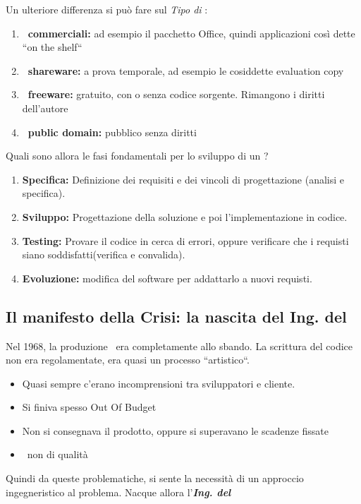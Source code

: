 Un ulteriore differenza si pu\`o fare sul \emph{Tipo di \sw }:
\begin{enumerate}
    \item \textbf{ \sw\ commerciali:} ad esempio il pacchetto Office, quindi applicazioni
    cos\`i dette ``on the shelf``
    \item \textbf{ \sw\ shareware:} a prova temporale, ad esempio le cosiddette evaluation copy
    \item \textbf{ \sw\ freeware:} gratuito, con o senza codice sorgente. Rimangono i diritti dell'autore
    \item \textbf{ \sw\ public domain:} pubblico senza diritti
\end{enumerate}
Quali sono allora le fasi fondamentali per lo sviluppo di un \sw ?
\begin{enumerate}
    \item \textbf{Specifica:} Definizione dei requisiti e dei vincoli di progettazione (analisi e specifica).
    \item \textbf{Sviluppo:} Progettazione della soluzione e poi l'implementazione in codice.
    \item \textbf{Testing:} Provare il codice in cerca di errori, oppure verificare che i requisti siano soddisfatti(verifica e convalida).
    \item \textbf{Evoluzione:} modifica del software per addattarlo  a nuovi requisti.
\end{enumerate}

\subsection{Il manifesto della Crisi: la nascita del Ing. del \Sw }
Nel 1968, la produzione \sw\ era completamente allo sbando.
La scrittura del codice non era regolamentate, era quasi un processo ``artistico``.
\begin{itemize}
    \item Quasi sempre c'erano incomprensioni tra sviluppatori e cliente.
    \item Si finiva spesso Out Of Budget
    \item Non si consegnava il prodotto, oppure si superavano le scadenze fissate
    \item \Sw\ non di qualit\`a
\end{itemize}
Quindi da queste problematiche, si sente la necessit\`a di un approccio ingegneristico al problema. Nacque allora l'\emph{\textbf{Ing. del \Sw\ }}
